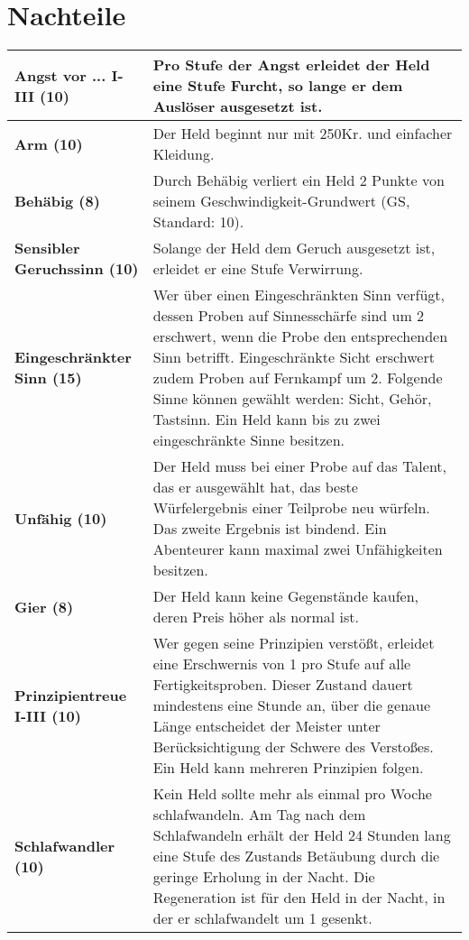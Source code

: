 \section{Nachteile}
\label{chap:nachteile}
\begin{longtable}{|p{5cm}|p{11cm}|}
\hline
\textbf{Angst vor ... I-III (10)} & Pro Stufe der Angst erleidet der Held eine Stufe Furcht, so lange er dem Auslöser ausgesetzt ist. \\ \hline

\textbf{Arm (10)} & Der Held beginnt nur mit 250Kr. und einfacher Kleidung. \\ \hline

\textbf{Behäbig (8)} & Durch Behäbig verliert ein Held 2 Punkte von seinem Geschwindigkeit-Grundwert (GS, Standard: 10). \\ \hline

\textbf{Sensibler Geruchssinn (10)} & Solange der Held dem Geruch ausgesetzt ist, erleidet er eine Stufe Verwirrung. \\ \hline

\textbf{Eingeschränkter Sinn (15)} & Wer über einen Eingeschränkten Sinn verfügt, dessen Proben auf Sinnesschärfe sind um 2 erschwert, wenn die Probe den entsprechenden Sinn betrifft. Eingeschränkte Sicht erschwert zudem Proben auf Fernkampf um 2. Folgende Sinne können gewählt werden: Sicht, Gehör, Tastsinn. Ein Held kann bis zu zwei eingeschränkte Sinne besitzen. \\ \hline

\textbf{Unfähig (10)} & Der Held muss bei einer Probe auf das Talent, das er ausgewählt hat, das beste Würfelergebnis einer Teilprobe neu würfeln. Das zweite Ergebnis ist bindend. Ein Abenteurer kann maximal zwei Unfähigkeiten besitzen. \\ \hline

\textbf{Gier (8)} & Der Held kann keine Gegenstände kaufen, deren Preis höher als normal ist. \\ \hline

\textbf{Prinzipientreue I-III (10)} & Wer gegen seine Prinzipien verstößt, erleidet eine Erschwernis von 1 pro Stufe auf alle Fertigkeitsproben. Dieser Zustand dauert mindestens eine Stunde an, über die genaue Länge entscheidet der Meister unter Berücksichtigung der Schwere des Verstoßes. Ein Held kann mehreren Prinzipien folgen. \\ \hline

\textbf{Schlafwandler (10)} & Kein Held sollte mehr als einmal pro Woche schlafwandeln. Am Tag nach dem Schlafwandeln erhält der Held 24 Stunden lang eine Stufe des Zustands Betäubung durch die geringe Erholung in der Nacht. Die Regeneration ist für den Held in der Nacht, in der er schlafwandelt um 1 gesenkt. \\ \hline


\end{longtable}
